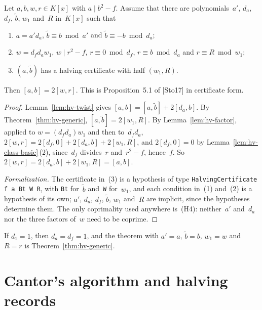 \begin{theorem}
\label{thm:hv-general}
\leanok
{}
Let $a, b, w, r \in K[x]$ with $a \mid b^2 - f$. Assume that there are polynomials~$a'$, $d_a$,
$d_f$, $\tilde b$, $w_1$ and~$R$ in~$K[x]$ such that
\begin{enumerate}
  \item $a = a' d_a$, $\tilde b \equiv b \bmod a'$ and $\tilde b \equiv -b \bmod d_a$;
  \item $w = d_f d_a w_1$, $w \mid r^2 - f$, $r \equiv 0 \bmod d_f$, $r \equiv b \bmod d_a$
    and $r \equiv R \bmod w_1$;
  \item $(a, \tilde b)$ has a halving certificate with half $(w_1, R)$.
\end{enumerate}
Then $[a, b] = 2[w, r]$. This is Proposition~5.1 of [Sto17] in certificate form.
\end{theorem}

\begin{proof}
\leanok
{}
Lemma~\ref{lem:hv-twist} gives $[a, b] = [a, \tilde b] + 2[d_a, b]$. By
Theorem~\ref{thm:hv-generic}, $[a, \tilde b] = 2[w_1, R]$. By Lemma~\ref{lem:hv-factor}, applied
to $w = (d_f d_a) w_1$ and then to~$d_f d_a$, $2[w, r] = 2[d_f, 0] + 2[d_a, b] + 2[w_1, R]$, and
$2[d_f, 0] = 0$ by Lemma~\ref{lem:hv-class-basic}\,(2), since~$d_f$ divides~$r$ and~$r^2 - f$,
hence~$f$. So $2[w, r] = 2[d_a, b] + 2[w_1, R] = [a, b]$.

\emph{Formalization.} The certificate in~(3) is a hypothesis of type
\texttt{HalvingCertificate f a Bt W R}, with \texttt{Bt} for~$\tilde b$ and~\texttt{W}
for~$w_1$, and each condition in~(1) and~(2) is a hypothesis of its own; $a'$, $d_a$, $d_f$,
$\tilde b$, $w_1$ and~$R$ are implicit, since the hypotheses determine them. The only coprimality
used anywhere is~(H4): neither~$a'$ and~$d_a$ nor the three factors of~$w$ need to be coprime.
\end{proof}

If $d_1 = 1$, then $d_a = d_f = 1$, and the theorem with $a' = a$, $\tilde b = b$, $w_1 = w$ and
$R = r$ is Theorem~\ref{thm:hv-generic}.

\section{Cantor's algorithm and halving records}
\label{sec:hv-cantor}

